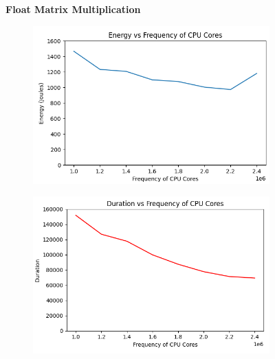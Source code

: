 \documentclass[times, 10pt,twocolumn]{article}
\begin{document}
 \begin{figure}[ht]
   \centering
   \textbf{Float Matrix Multiplication}\par\medskip
   \begin{subfigure}[b]{0.45\textwidth}
     \includegraphics[width=\textwidth]{imgs/study_1_results/var_freq/floatmatmul/Freq_Energy.png}
     \caption{}
     \label{fig:plot10}
   \end{subfigure}
   \hfill
   \begin{subfigure}[b]{0.45\textwidth}
      \includegraphics[width=\textwidth]{imgs/study_1_results/var_freq/floatmatmul/Freq_Duration.png}
     \caption{}
     \label{fig:plot11}
   \end{subfigure}
   

\end{figure}
\end{document}
